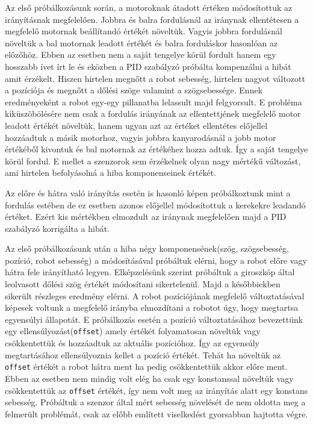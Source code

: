 Az első próbálkozásunk során, a motoroknak átadott értéken módosítottuk az irányításnak megfelelően. Jobbra és balra fordulásnál az iránynak ellentétesen a megfelelő motornak beállítandó értékét növeltük. Vagyis jobbra fordulásnál növeltük a bal motornak leadott értékét és balra forduláskor hasonlóan az előzőhöz. Ebben az esetben nem a saját tengelye körül fordult hanem egy hosszabb ívet írt le és eközben a PID szabályzó próbálta kompenzálni a hibát amit érzékelt. Hiszen hirtelen megnőtt a robot sebesség, hirtelen nagyot változott a pozíciója és megnőtt a dőlési szöge valamint a szögsebessége. Ennek eredményeként a robot egy-egy pillanatba lelassult majd felgyorsult. E probléma kiküszöbölésére nem csak a fordulás irányának az ellentettjének megfelelő motor leadott értékét növeltük, hanem ugyan azt az értéket ellentétes előjellel hozzáadtuk a másik motorhoz, vagyis jobbra kanyarodásnál a jobb motor értékéből kivontuk és bal motornak az értékéhez hozza adtuk. Így a saját tengelye körül fordul. E mellet a szenzorok sem érzékelnek olyan nagy mértékű változást, ami hirtelen befolyásolná a hiba komponenseinek értékét.

Az előre és hátra való irányítás esetén is hasonló képen próbálkoztunk mint a fordulás estében de ez esetben azonos előjellel módosítottuk a kerekekre leadandó értéket. Ezért kis mértékben elmozdult az iránynak megfelelően majd a PID szabályzó korrigálta a hibát.

Az első próbálkozásunk után a hiba négy komponensének(szög, szögsebesség, pozíció, robot sebesség) a módosításával próbáltuk elérni, hogy a robot előre vagy hátra fele irányítható legyen. Elképzelésünk szerint próbáltuk a giroszkóp által leolvasott dőlési szög értékét módosítani sikertelenül. Majd a későbbiekben sikerült részleges eredmény elérni. A robot pozíciójának megfelelő változtatásával képesek voltunk a megfelelő irányba elmozdítani a robotot úgy, hogy megtartsa egyensúlyi állapotát. E próbálkozás esetén a pozíció változtatásához bevezettünk egy ellensúlyozást(\texttt{offset}) amely értékét folyamatosan növeltük vagy csökkentettük és hozzáadtuk az aktuális pozícióhoz. Így az egyensúly megtartásához ellensúlyoznia kellet a pozíció értékét. Tehát ha növeltük az \texttt{offset} értékét a robot hátra ment ha pedig csökkentettük akkor előre ment. Ebben az esetben nem mindig volt elég ha csak egy konstanssal növeltük vagy csökkentettük az \texttt{offset} értékét, így nem volt meg az irányítás alatt egy konstans sebesség. Próbáltuk a szenzor által mért sebesség növelését de nem oldotta meg a felmerült problémát, csak az előbb említett viselkedést gyorsabban hajtotta végre.

